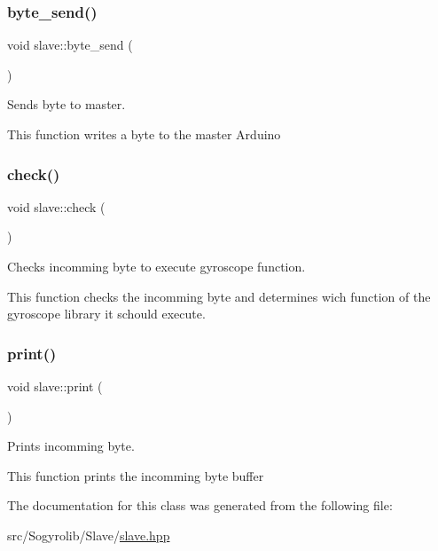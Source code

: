 \subsubsection{\texorpdfstring{byte\+\_\+send()}{byte\_send()}}
{\footnotesize\ttfamily void slave\+::byte\+\_\+send (\begin{DoxyParamCaption}{ }\end{DoxyParamCaption})\hspace{0.3cm}{\ttfamily [inline]}}



Sends byte to master. 

This function writes a byte to the master Arduino \mbox{\label{classslave_ab93bbc9a1b5e8b5fafb01b63e05440b0}} 
\subsubsection{\texorpdfstring{check()}{check()}}
{\footnotesize\ttfamily void slave\+::check (\begin{DoxyParamCaption}{ }\end{DoxyParamCaption})\hspace{0.3cm}{\ttfamily [inline]}}



Checks incomming byte to execute gyroscope function. 

This function checks the incomming byte and determines wich function of the gyroscope library it schould execute. \mbox{\label{classslave_a47169cdf6f0aaa0c303c5d860c89bef2}} 
\subsubsection{\texorpdfstring{print()}{print()}}
{\footnotesize\ttfamily void slave\+::print (\begin{DoxyParamCaption}{ }\end{DoxyParamCaption})\hspace{0.3cm}{\ttfamily [inline]}}



Prints incomming byte. 

This function prints the incomming byte buffer 

The documentation for this class was generated from the following file\+:\begin{DoxyCompactItemize}
\item 
src/\+Sogyrolib/\+Slave/\hyperlink{slave_8hpp}{slave.\+hpp}\end{DoxyCompactItemize}
